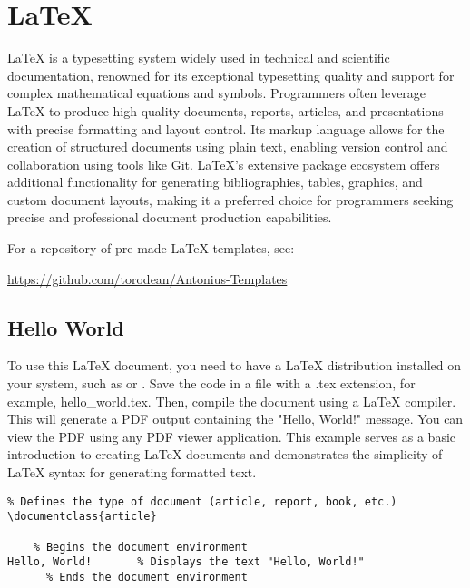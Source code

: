 \chapter{\LaTeX {}}
\thispagestyle{fancy}
\lstset{}\lstset{language=tex, style=latexstyle}

LaTeX is a typesetting system widely used in technical and scientific documentation, renowned for its exceptional typesetting quality and support for complex mathematical equations and symbols. Programmers often leverage LaTeX to produce high-quality documents, reports, articles, and presentations with precise formatting and layout control. Its markup language allows for the creation of structured documents using plain text, enabling version control and collaboration using tools like Git. LaTeX's extensive package ecosystem offers additional functionality for generating bibliographies, tables, graphics, and custom document layouts, making it a preferred choice for programmers seeking precise and professional document production capabilities.

\begin{urlbox}
For a repository of pre-made LaTeX templates, see:

\url{https://github.com/torodean/Antonius-Templates}
\end{urlbox}

\section{Hello World}

To use this LaTeX document, you need to have a LaTeX distribution installed on your system, such as  or . Save the code in a file with a .tex extension, for example, hello\_world.tex. Then, compile the document using a LaTeX compiler. This will generate a PDF output containing the "Hello, World!" message. You can view the PDF using any PDF viewer application. This example serves as a basic introduction to creating LaTeX documents and demonstrates the simplicity of LaTeX syntax for generating formatted text.

\begin{lstlisting}
% Defines the type of document (article, report, book, etc.)
\documentclass{article}

    % Begins the document environment
Hello, World!       % Displays the text "Hello, World!"
      % Ends the document environment
\end{lstlisting}









